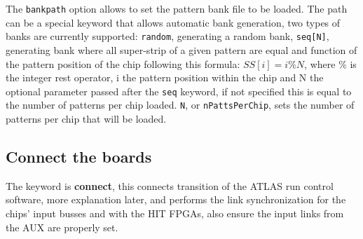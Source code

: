     The \texttt{bankpath} option allows to set the pattern bank
    file to be loaded. The path can be a special keyword that
    allows automatic bank generation, two types of banks are
    currently supported: \texttt{random}, generating a random bank,
    \texttt{seq[N]}, generating bank where all super-strip of
    a given pattern are equal and function of the pattern position
    of the chip following this formula: $SS[i] = i\%N$, where \% is
    the integer rest operator, i the pattern position within the chip
    and N the optional parameter passed after the \texttt{seq}
    keyword, if not specified this is equal to the number of patterns
    per chip loaded. \texttt{N}, or \texttt{nPattsPerChip}, sets
    the number of patterns per chip that will be loaded.

\subsection{Connect the boards}
\label{sec:procconnect}

The keyword is	\textbf{connect}, this connects transition
	of the ATLAS run control software, more explanation later, and
	performs the link synchronization for the chips' input busses and
	with the HIT FPGAs, also ensure the input links from the AUX
	are properly set.

